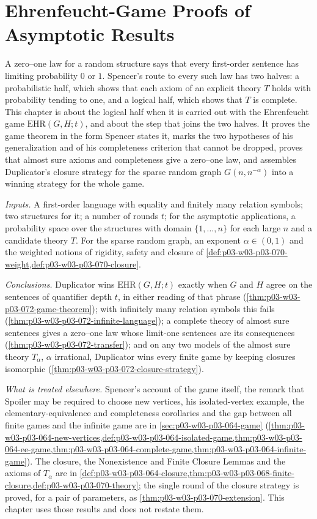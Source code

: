 \chapter{Ehrenfeucht-Game Proofs of Asymptotic Results}
\label{sec:p03-w03-p03-072-game-proofs}

A zero--one law for a random structure says that every first-order sentence
has limiting probability \(0\) or \(1\).  Spencer's route to every such law
has two halves: a probabilistic half, which shows that each axiom of an
explicit theory \(T\) holds with probability tending to one, and a logical
half, which shows that \(T\) is complete.  This chapter is about the logical
half when it is carried out with the Ehrenfeucht game
\(\mathrm{EHR}(G,H;t)\), and about the step that joins the two halves.  It
proves the game theorem in the form Spencer states it, marks the two
hypotheses of his generalization and of his completeness criterion that
cannot be dropped, proves that almost sure axioms and completeness give a
zero--one law, and assembles Duplicator's closure strategy for the sparse
random graph \(G(n,n^{-\alpha})\) into a winning strategy for the whole game.

\emph{Inputs.} A first-order language with equality and finitely many
relation symbols; two structures for it; a number of rounds \(t\); for the
asymptotic applications, a probability space over the structures with
domain \(\{1,\ldots,n\}\) for each large \(n\) and a candidate theory \(T\).
For the sparse random graph, an exponent \(\alpha\in(0,1)\) and the
weighted notions of rigidity, safety and closure of
\cref{def:p03-w03-p03-070-weight,def:p03-w03-p03-070-closure}.

\emph{Conclusions.} Duplicator wins \(\mathrm{EHR}(G,H;t)\) exactly when
\(G\) and \(H\) agree on the sentences of quantifier depth \(t\), in either
reading of that phrase (\cref{thm:p03-w03-p03-072-game-theorem}); with
infinitely many relation symbols this fails
(\cref{thm:p03-w03-p03-072-infinite-language}); a complete theory of almost
sure sentences gives a zero--one law whose limit-one sentences are its
consequences (\cref{thm:p03-w03-p03-072-transfer}); and on any two models
of the almost sure theory \(T_\alpha\), \(\alpha\) irrational, Duplicator
wins every finite game by keeping closures isomorphic
(\cref{thm:p03-w03-p03-072-closure-strategy}).

\emph{What is treated elsewhere.} Spencer's account of the game itself,
the remark that Spoiler may be required to choose new vertices, his
isolated-vertex example, the elementary-equivalence and completeness
corollaries and the gap between all finite games and the infinite game are
in \cref{sec:p03-w03-p03-064-game}
(\cref{thm:p03-w03-p03-064-new-vertices,def:p03-w03-p03-064-isolated-game,thm:p03-w03-p03-064-ee-game,thm:p03-w03-p03-064-complete-game,thm:p03-w03-p03-064-infinite-game}).
The closure, the Nonexistence and Finite Closure Lemmas and the axioms of
\(T_\alpha\) are in \cref{def:p03-w03-p03-064-closure,thm:p03-w03-p03-068-finite-closure,def:p03-w03-p03-070-theory};
the single round of the closure strategy is proved, for a pair of
parameters, as \cref{thm:p03-w03-p03-070-extension}.  This chapter uses
those results and does not restate them.

